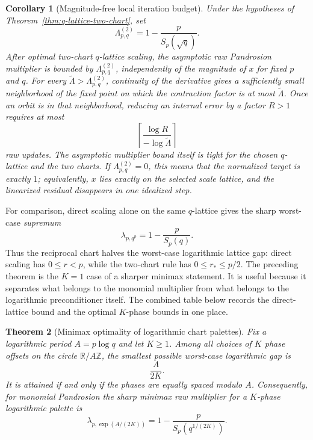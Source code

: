 \documentclass[10pt,a4paper]{article}
\theoremstyle{plain}
\newtheorem{theorem}{Theorem}[section]
\newtheorem{corollary}[theorem]{Corollary}
\theoremstyle{definition}
\theoremstyle{remark}
\newcommand{\R}{\mathbb{R}}
\begin{document}
\begin{corollary}[Magnitude-free local iteration budget]
\label{cor:q-lattice-complexity}
Under the hypotheses of Theorem~\ref{thm:q-lattice-two-chart}, set
\[
  \Lambda_{p,q}^{(2)}=1-\frac{p}{S_p(\sqrt q)}.
\]
After optimal two-chart $q$-lattice scaling, the asymptotic raw Pandrosion
multiplier is bounded by $\Lambda_{p,q}^{(2)}$, independently of the magnitude
of $x$ for fixed $p$ and $q$.  For every
$\widetilde\Lambda>\Lambda_{p,q}^{(2)}$, continuity of the derivative gives a
sufficiently small neighborhood of the fixed point on which the contraction
factor is at most $\widetilde\Lambda$.  Once an orbit is in that neighborhood,
reducing an internal error by a factor $R>1$ requires at most
\[
  \left\lceil \frac{\log R}{-\log \widetilde\Lambda}\right\rceil
\]
raw updates.  The asymptotic multiplier bound itself is tight for the chosen
$q$-lattice and the two charts.  If $\Lambda_{p,q}^{(2)}=0$, this means that the
normalized target is exactly $1$; equivalently, $x$ lies exactly on the selected
scale lattice, and the linearized residual disappears in one idealized step.
\end{corollary}

For comparison, direct scaling alone on the same $q$-lattice gives the sharp
worst-case \emph{supremum}
\[
  \lambda_{p,q^p}=1-\frac{p}{S_p(q)}.
\]
Thus the reciprocal chart halves the worst-case logarithmic lattice gap: direct
scaling has $0\le r<p$, while the two-chart rule has $0\le r_*\le p/2$.
The preceding theorem is the $K=1$ case of a sharper minimax statement.  It is
useful because it separates what belongs to the monomial multiplier from what
belongs to the logarithmic preconditioner itself.  The combined table below
records the direct-lattice bound and the optimal $K$-phase bounds in one place.


\begin{theorem}[Minimax optimality of logarithmic chart palettes]
\label{thm:minimax-palette}
Fix a logarithmic period $A=p\log q$ and let $K\ge1$.  Among all choices of
$K$ phase offsets on the circle $\R/A\mathbb Z$, the smallest possible
worst-case logarithmic gap is
\[
  \frac{A}{2K}.
\]
It is attained if and only if the phases are equally spaced modulo $A$.
Consequently, for monomial Pandrosion the sharp minimax raw multiplier for a
$K$-phase logarithmic palette is
\begin{equation}
  \lambda_{p,\exp(A/(2K))}
  =1-\frac{p}{S_p(q^{1/(2K)})}.
  \label{eq:K-palette-bound}
\end{equation}
\end{theorem}
\end{document}
